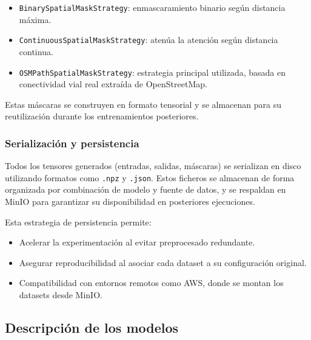 \begin{itemize}
	\item \texttt{BinarySpatialMaskStrategy}: enmascaramiento binario según distancia máxima.
	\item \texttt{ContinuousSpatialMaskStrategy}: atenúa la atención según distancia continua.
	\item \texttt{OSMPathSpatialMaskStrategy}: estrategia principal utilizada, basada en conectividad vial real extraída de OpenStreetMap.
\end{itemize}

Estas máscaras se construyen en formato tensorial y se almacenan para su reutilización durante los entrenamientos posteriores.

\subsubsection*{Serialización y persistencia}

Todos los tensores generados (entradas, salidas, máscaras) se serializan en disco utilizando formatos como \texttt{.npz} y \texttt{.json}. Estos ficheros se almacenan de forma organizada por combinación de modelo y fuente de datos, y se respaldan en MinIO para garantizar su disponibilidad en posteriores ejecuciones.

Esta estrategia de persistencia permite:

\begin{itemize}
	\item Acelerar la experimentación al evitar preprocesado redundante.
	\item Asegurar reproducibilidad al asociar cada dataset a su configuración original.
	\item Compatibilidad con entornos remotos como AWS, donde se montan los datasets desde MinIO.
\end{itemize}

\subsection{Descripción de los modelos}
\label{sec:descripcion_modelos}

